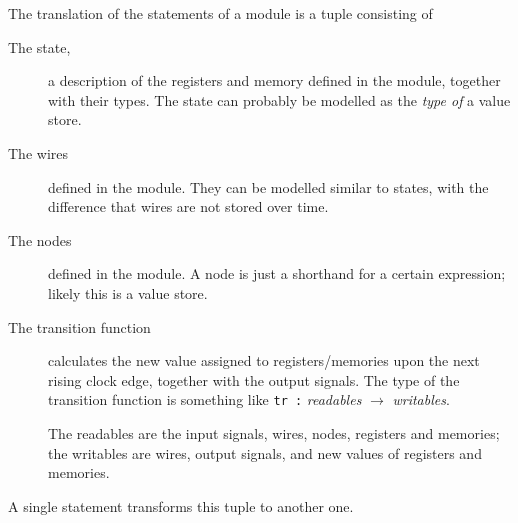 \documentclass[a4paper]{article}
\begin{document}
The translation of the statements of a module is a tuple consisting of
\begin{description}

\item[The state,]
	a description of the registers and memory defined in the module, together with their types.
	The state can probably be modelled as the \emph{type of} a value store.

\item[The wires] defined in the module.
	They can be modelled similar to states, with the difference that wires are not stored over time.

\item[The nodes] defined in the module.
	A node is just a shorthand for a certain expression;
	likely this is a value store.

\item[The transition function]
	calculates the new value assigned to registers/memories upon the next rising clock edge, together with the output signals.
	The type of the transition function is something like
	\texttt{tr :} \textit{readables} $\to$ \textit{writables}.

	The readables are the input signals, wires, nodes, registers and memories;
	the writables are wires, output signals, and new values of registers and memories.
\end{description}
A single statement transforms this tuple to another one.
\end{document}
